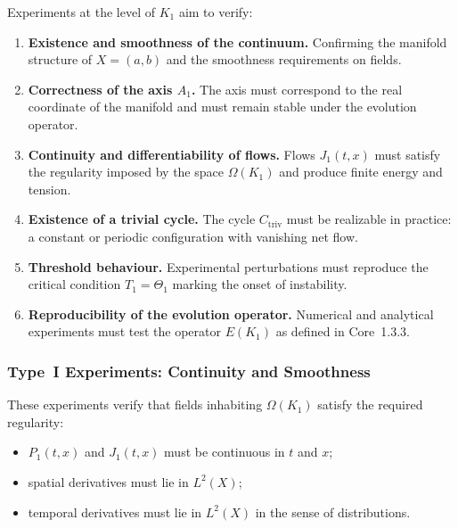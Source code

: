 Experiments at the level of $K_1$ aim to verify:

\begin{enumerate}
    \item \textbf{Existence and smoothness of the continuum.}
          Confirming the manifold structure of $X=(a,b)$
          and the smoothness requirements on fields.

    \item \textbf{Correctness of the axis $A_1$.}
          The axis must correspond to the real coordinate of the
          manifold and must remain stable under the evolution operator.

    \item \textbf{Continuity and differentiability of flows.}
          Flows $J_1(t,x)$ must satisfy the regularity imposed by the
          space $\Omega(K_1)$ and produce finite energy and tension.

    \item \textbf{Existence of a trivial cycle.}
          The cycle $C_{\mathrm{triv}}$ must be realizable in practice:
          a constant or periodic configuration with vanishing net flow.

    \item \textbf{Threshold behaviour.}
          Experimental perturbations must reproduce the critical
          condition $T_1 = \Theta_1$ marking the onset of instability.

    \item \textbf{Reproducibility of the evolution operator.}
          Numerical and analytical experiments must test the
          operator $E(K_1)$ as defined in Core~1.3.3.
\end{enumerate}


\subsubsection{Type~I Experiments: Continuity and Smoothness}

These experiments verify that fields inhabiting $\Omega(K_1)$ satisfy the
required regularity:

\begin{itemize}
    \item $P_1(t,x)$ and $J_1(t,x)$ must be continuous in $t$ and $x$;
    \item spatial derivatives must lie in $L^2(X)$;
    \item temporal derivatives must lie in $L^2(X)$ in the sense of
          distributions.
\end{itemize}


